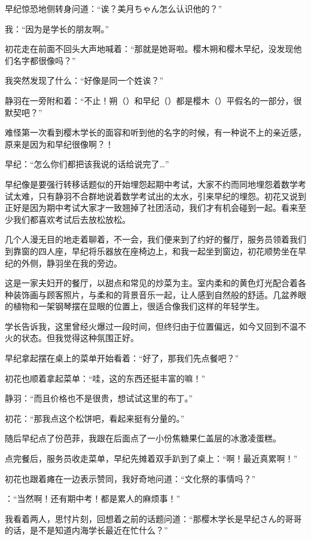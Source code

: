 早纪惊恐地侧转身问道：“诶？美月ちゃん怎么认识他的？”

我：“因为是学长的朋友啊。”

初花走在前面不回头大声地喊着：“那就是她哥啦。樱木朔和樱木早纪，没发现他们名字都很像吗？”

我突然发现了什么：“好像是同一个姓诶？”

静羽在一旁附和着：“不止！朔（）和早纪（）都是樱木（）平假名的一部分，很默契吧？”

难怪第一次看到樱木学长的面容和听到他的名字的时候，有一种说不上的亲近感，原来是因为和早纪很像啊？！

早纪：“怎么你们都把该我说的话给说完了…”

早纪像是要强行转移话题似的开始埋怨起期中考试，大家不约而同地埋怨着数学考试太难，只有静羽不合群地说着数学考试出的太水，引来早纪的埋怨。初花又说到正好是因为期中考试大家才一致翘掉了社团活动，我们才有机会碰到一起。看来至少我们都喜欢考试后去放松放松。

\cutlinef{\timepast}

几个人漫无目的地走着聊着，不一会，我们便来到了约好的餐厅，服务员领着我们到靠窗的四人座，早纪将乐器放在座椅边上，和我一起坐到窗边，初花顺势坐在早纪的外侧，静羽坐在我的旁边。

这是一家夫妇开的餐厅，以甜点和常见的炒菜为主。室内柔和的黄色灯光配合着各种装饰画与顾客照片，与柔和的背景音乐一起，让人感到自然般的舒适。几盆养眼的植物和一架钢琴摆在显眼的位置上，很适合像我们这样的年轻学生。

学长告诉我，这里曾经火爆过一段时间，但终归由于位置偏远，如今又回到不温不火的状态。但我觉得这种氛围正好。

早纪拿起摆在桌上的菜单开始看着：“好了，那我们先点餐吧？”

初花也顺着拿起菜单：“哇，这的东西还挺丰富的嘛！”

静羽：“而且价格也不是很贵，想试试这里的布丁\pudding。”

初花：“那我点这个松饼吧，看起来挺有分量的\pancake。”

随后早纪点了份芭菲\parfait，我跟在后面点了一小份焦糖果仁盖层的冰激凌蛋糕\shortcake。

点完餐后，服务员收走菜单，早纪先摊着双手趴到了桌上：“啊！最近真累啊！”

初花也跟着瘫在一边表示赞同，我好奇地问道：“文化祭的事情吗？”

\saki：“当然啊！还有期中考！都是累人的麻烦事！”

我看着两人，思忖片刻，回想着之前的话题问道：“那樱木学长是早纪さん的哥哥的话，是不是知道内海学长最近在忙什么？”

